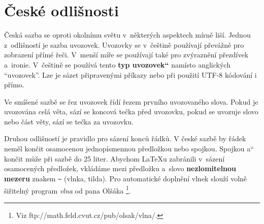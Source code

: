 \documentclass[a4paper,11pt, twocolumn]{article}
\newcommand\quot[1]{\quotedblbase #1\textquotedblleft}
\begin{document}
\section{České odlišnosti}
{Česká sazba se oproti okolnímu světu v~některých aspektech mírně liší. Jednou z~odlišností je sazba uvozovek. Uvozovky se v~češtině používají převážně pro zobrazení přímé řeči. V~menší míře se používají také pro zvýraznění přezdívek a~ironie. V~češtině se používá tento \textbf{\quot{typ uvozovek}} namísto anglických ``uvozovek''. Lze je sázet připravenými příkazy nebo při použití UTF-8 kódování i přímo.\par
Ve smíšené sazbě se řez uvozovek řídí řezem prvního uvozovaného slova. Pokud je uvozována celá věta, sází se koncová tečka před uvozovku, pokud se uvozuje slovo nebo část věty, sází se tečka za uvozovku.\par
Druhou odlišností je pravidlo pro sázení­ konců řádků. V české sazbě by řádek neměl končit osamocenou jednopí­smennou předložkou nebo spojkou. Spojkou \quot{a} končit může při sazbě do 25 liter. Abychom \LaTeX u zabránili v~sázení osamocených předložek, vkládáme mezi předložku a~slovo \textbf{nezlomitelnou mezeru} znakem \verb$~$ (vlnka, tilda). Pro automatické doplnění vlnek slouží volně šiřitelný program \emph{vlna} od pana Olšáka \footnote{Viz ftp://math.feld.cvut.cz/pub/olsak/vlna/.}.}
\end{document}
